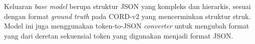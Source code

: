 
Keluaran \emph{base model} berupa struktur JSON yang kompleks dan hierarkis, sesuai dengan format \emph{ground truth} pada \dataset{} CORD-v2 yang mencerminkan struktur struk. Model ini juga menggunakan token-to-JSON \emph{converter} untuk mengubah format yang dari deretan sekuensial token yang digunakan menjadi format JSON.


